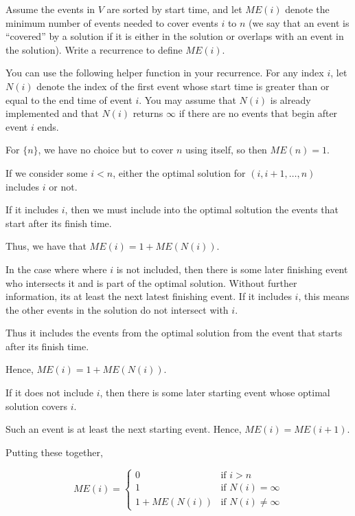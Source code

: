 \begin{questions}
	\question[4] Assume the events in $V$ are sorted by start time, and let $ME(i)$ denote the minimum number of events needed to cover events $i$ to $n$ (we say that an event is ``covered'' by a solution if it is either in the solution or overlaps with an event in the solution). Write a recurrence to define $ME(i)$.

	You can use the following helper function in your recurrence. For any index $i$, let $N(i)$ denote the index of the first event whose start time is greater than or equal to the end time of event $i$. You may assume that $N(i)$ is already implemented and that $N(i)$ returns $\infty$ if there are no events that begin after event $i$ ends.

	\ifsolutions\fi


	\begin{soln}
		For \(\{n\}\), we have no choice but to cover \(n\) using itself, so then \(ME(n) = 1\).

		If we consider some \(i < n\), either the optimal solution for \((i, i + 1, \dots, n)\) includes \(i\) or not.

		If it includes \(i\), then we must include into the optimal soltution the events that start after its finish time.

		Thus, we have that \(ME(i) = 1 + ME(N(i))\).

		In the case where where \(i\) is not included, then there is some later finishing event who intersects it and is part of the optimal solution.
		Without further information, its at least the next latest finishing event.
		If it includes \(i\), this means the other events in the solution do not intersect with \(i\).

		Thus it includes the events from the optimal solution from the event that starts after its finish time.

		Hence, \(ME(i) = 1 + ME(N(i))\).

		If it does not include \(i\), then there is some later starting event whose optimal solution covers \(i\).

		Such an event is at least the next starting event. Hence, \(ME(i) = ME(i + 1)\).

		Putting these together,

		\[
			ME(i) = \begin{cases}
				0            & \text{if } i > n            \\
				1            & \text{if } N(i) = \infty    \\
				1 + ME(N(i)) & \text{if } N(i) \neq \infty
			\end{cases}
		\]



\end{soln}
\end{questions}
